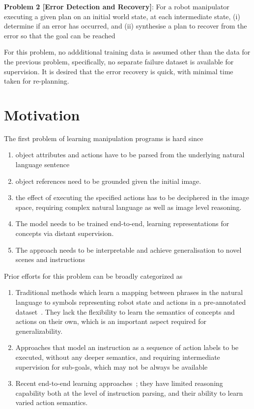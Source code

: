 \textbf{Problem 2 [Error Detection and Recovery]}: For a robot manipulator executing a given plan on an initial world state, at each intermediate state, (i) determine if an error has occurred, and (ii) synthesise a plan to recover from the error so that the goal can be reached

For this problem, no addditional training data is assumed other than the data for the previous problem, specifically, no separate failure dataset is available for supervision. It is desired that the error recovery is quick, with minimal time taken for re-planning.

\section{Motivation}

The first problem of learning manipulation programs is hard since
\begin{enumerate}
    \item object attributes and actions have to be parsed from the underlying natural language sentence
    \item object references need to be grounded given the initial image.
    \item the effect of executing the specified actions has to be deciphered in the image space, requiring complex natural language as well as image level reasoning.
    \item The model needs to be trained end-to-end, learning representations for concepts via distant supervision.
    \item The approach needs to be interpretable and achieve generalisation to novel scenes and instructions
\end{enumerate}

Prior efforts for this problem can be broadly categorized as 
\begin{enumerate}
    \item Traditional methods which learn a mapping between phrases in the natural language to symbols representing robot state and actions in a pre-annotated dataset~\cite{howard2014natural,paul2016efficient,tellex2011approaching,matuszek2013learning,knepper2013ikeabot,gopalan2018sequence,williams2018learning}. They lack the flexibility to learn the semantics of concepts and actions on their own, which is an important aspect required for generalizability.
    \item Approaches that model an instruction as a sequence of action labels to be executed, without any deeper semantics, and requiring intermediate supervision for sub-goals, which may not be always be available~\cite{paxton2019prospection,shah2018bayesian,wang2020learning,kress2008translating,lazaro2019beyond,tenorth2010understanding,lisca2015towards,misra2016tell} 
    \item Recent end-to-end learning approaches~\cite{konidaris2018skills,wang2021learning, zettlemoyer2005learning,xia2018learning,silver2020few,zhu2021hierarchical,shridhar2022cliport,zeng2020transporter}; they have limited reasoning capability both at the level of instruction parsing, and their ability to learn varied action semantics.
\end{enumerate}

